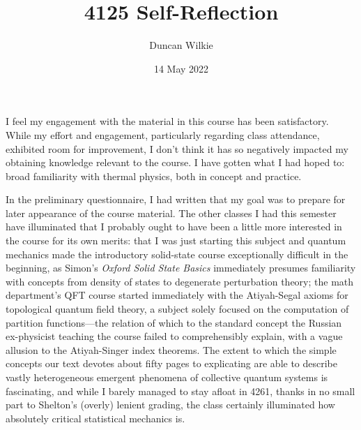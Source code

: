 \documentclass[12pt]{article}
\title{4125 Self-Reflection}
\author{Duncan Wilkie}
\date{14 May 2022}
\begin{document}
\maketitle

\section*{}
I feel my engagement with the material in this course has been satisfactory.
While my effort and engagement, particularly regarding class attendance, exhibited room for improvement,
I don't think it has so negatively impacted my obtaining knowledge relevant to the course.
I have gotten what I had hoped to: broad familiarity with thermal physics, both in concept and practice.

In the preliminary questionnaire, I had written that my goal was to prepare for later appearance of the course material.
The other classes I had this semester have illuminated that I probably ought to have been a little more interested in the course for its own
merits: that I was just starting this subject and quantum mechanics made the introductory solid-state course exceptionally difficult in the
beginning, as Simon's \textit{Oxford Solid State Basics} immediately presumes familiarity with concepts from density of states
to degenerate perturbation theory; the math department's QFT course started immediately with the Atiyah-Segal axioms for topological
quantum field theory, a subject solely focused on the computation of partition functions---the relation of which to the standard concept
the Russian ex-physicist teaching the course failed to comprehensibly explain, with a vague allusion to the Atiyah-Singer index theorems.
The extent to which the simple concepts our text devotes about fifty pages to explicating are able to describe vastly heterogeneous
emergent phenomena of collective quantum systems is fascinating, and while I barely managed to stay afloat in 4261, thanks in no small part
to Shelton's (overly) lenient grading, the class certainly illuminated how absolutely critical statistical mechanics is.
\end{document}
